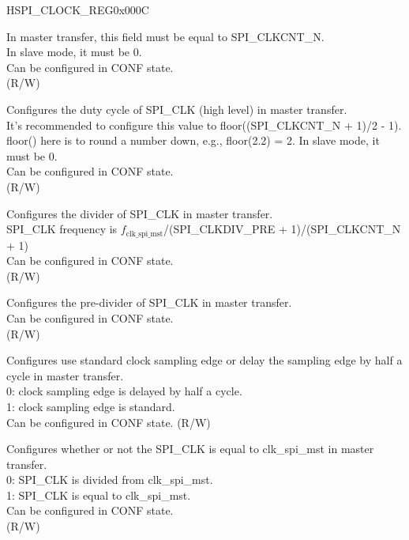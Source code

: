 \begin{register}{H}{SPI\_CLOCK\_REG}{0x000C}\label{regdesc:SPICLOCKREG}
%
%
%
%
%
%
%
\regnewline%
\begin{regdesc}\begin{reglist}
\label{fielddesc:SPICLKCNTL}\item [SPI\_CLKCNT\_L]
In master transfer, this field must be equal to SPI\_CLKCNT\_N. \\
In slave mode, it must be 0. \\
Can be configured in CONF state.\\
(R/W)
\label{fielddesc:SPICLKCNTH}\item [SPI\_CLKCNT\_H] Configures the duty cycle of SPI\_CLK (high level) in master transfer. \\
It's recommended to configure this value to floor((SPI\_CLKCNT\_N + 1)/2 - 1). floor() here is to round a number down, e.g., floor(2.2) = 2. In slave mode, it must be 0. \\
Can be configured in CONF state. \\ (R/W)
\label{fielddesc:SPICLKCNTN}\item [SPI\_CLKCNT\_N] Configures the divider of SPI\_CLK in master transfer. \\
SPI\_CLK frequency is $f_{\textrm{clk\_spi\_mst}}$/(SPI\_CLKDIV\_PRE + 1)/(SPI\_CLKCNT\_N + 1) \\
Can be configured in CONF state. \\ (R/W)
\label{fielddesc:SPICLKDIVPRE}\item [SPI\_CLKDIV\_PRE] Configures the pre-divider of SPI\_CLK in master transfer. \\
Can be configured in CONF state. \\ (R/W)
\label{fielddesc:SPICLKEDGESEL}\item [SPI\_CLK\_EDGE\_SEL] Configures use standard clock sampling edge or delay the sampling edge by half a cycle in master transfer.\\
0: clock sampling edge is delayed by half a cycle.\\
1: clock sampling edge is standard.\\
Can be configured in CONF state. (R/W)

\label{fielddesc:SPICLKEQUSYSCLK}\item [SPI\_CLK\_EQU\_SYSCLK] Configures whether or not the SPI\_CLK is equal to clk\_spi\_mst in master transfer.\\
0: SPI\_CLK is divided from clk\_spi\_mst.\\
1: SPI\_CLK is equal to clk\_spi\_mst.\\
Can be configured in CONF state. \\ (R/W)
\end{reglist}\end{regdesc}
\end{register}


